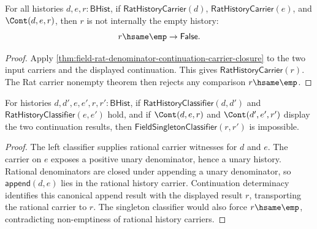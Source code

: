 \begin{theorem}
\label{thm:field-rat-history-carrier-continuation-result-not-empty}
For all histories $d,e,r:\mathsf{BHist}$, if
$\mathsf{RatHistoryCarrier}(d)$, $\mathsf{RatHistoryCarrier}(e)$, and
$\Cont(d,e,r)$, then $r$ is not internally the empty history:
$$
r\hsame\emp \to \mathsf{False}.
$$
\end{theorem}
\begin{proof}
Apply
\autoref{thm:field-rat-denominator-continuation-carrier-closure} to the two
input carriers and the displayed continuation. This gives
$\mathsf{RatHistoryCarrier}(r)$. The Rat carrier nonempty theorem then rejects
any comparison $r\hsame\emp$.
\end{proof}

\begin{theorem}
\label{thm:rat-history-classifier-continuation-result-field-singleton-classifier-absurd}
For histories $d,d',e,e',r,r':\mathsf{BHist}$, if
$\mathsf{RatHistoryClassifier}(d,d')$ and
$\mathsf{RatHistoryClassifier}(e,e')$ hold, and if
$\Cont(d,e,r)$ and $\Cont(d',e',r')$ display the two continuation results, then
$\mathsf{FieldSingletonClassifier}(r,r')$ is impossible.
\end{theorem}
\begin{proof}
The left classifier supplies rational carrier witnesses for $d$ and $e$.
The carrier on $e$ exposes a positive unary denominator, hence a unary history.
Rational denominators are closed under appending a unary denominator, so
$\mathsf{append}(d,e)$ lies in the rational history carrier. Continuation
determinacy identifies this canonical append result with the displayed result
$r$, transporting the rational carrier to $r$. The singleton classifier would
also force $r\hsame\emp$, contradicting non-emptiness of rational history
carriers.
\end{proof}

